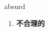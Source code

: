 
\begin{frame}
{\huge absurd}
\begin{center}
\begin{enumerate}\Large
  \item \textbf{不合理的}
\end{enumerate}
\end{center}
\end{frame}

